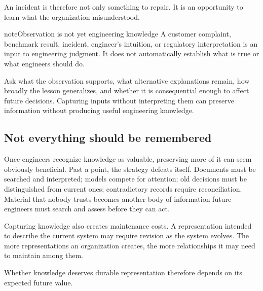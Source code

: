 An incident is therefore not only something to repair. It is an opportunity to learn what the
organization misunderstood.

\begin{bookbox}{note}{Observation is not yet engineering knowledge} %
A customer complaint, benchmark result, incident, engineer's intuition, or regulatory interpretation
is an input to engineering judgment. It does not automatically establish what is true or what
engineers should do.

Ask what the observation supports, what alternative explanations remain, how broadly the lesson
generalizes, and whether it is consequential enough to affect future decisions. Capturing inputs
without interpreting them can preserve information without producing useful engineering knowledge.
\end{bookbox}

\subsection{Not everything should be remembered}\label{sec-selective-memory}

Once engineers recognize knowledge as valuable, preserving more of it can seem obviously beneficial.
Past a point, the strategy defeats itself. Documents must be searched and interpreted; models
compete for attention; old decisions must be distinguished from current ones; contradictory records
require reconciliation. Material that nobody trusts becomes another body of information future
engineers must search and assess before they can act.

Capturing knowledge also creates maintenance costs. A representation intended to describe the
current system may require revision as the system evolves. The more representations an organization
creates, the more relationships it may need to maintain among them.

Whether knowledge deserves durable representation therefore depends on its expected future value.

